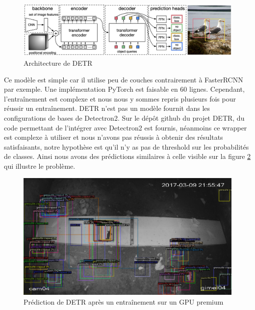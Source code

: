 \begin{figure}[th!]
    \centering
    \includegraphics[width=\textwidth]{images/detr_architecture.png}
    \caption{Architecture de DETR}
    \label{fig:detr_architecture}
\end{figure}
Ce modèle est simple car il utilise peu de couches contrairement à FasterRCNN par exemple. Une implémentation PyTorch est faisable en 60 lignes. Cependant, l'entraînement est complexe et nous nous y sommes repris plusieurs fois pour réussir un entraînement.
DETR n'est pas un modèle fournit dans les configurations de bases de Detectron2. Sur le dépôt github du projet DETR, du code permettant de l'intégrer avec Detectron2 est fournis, néanmoins ce wrapper est complexe à utiliser et nous n'avons pas réussis à obtenir des résultats satisfaisants, notre hypothèse est qu'il n'y as pas de threshold sur les probabilités de classes. Ainsi nous avons des prédictions similaires à celle visible sur la figure \ref{fig:detr_predictions_threshold} qui illustre le problème.
\begin{figure}[h!]
    \centering
    \includegraphics[width=\textwidth]{images/detr_threshold.png}
    \caption{Prédiction de DETR après un entraînement sur un GPU premium}
    \label{fig:detr_predictions_threshold}
\end{figure}


